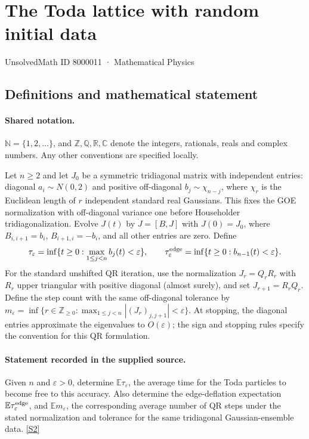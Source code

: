 \documentclass[11pt]{article}
\newcommand{\sref}[2]{\hyperlink{source:#1:#2}{[S#2]}}
\begin{document}
\setcounter{section}{8000010}
\section{The Toda lattice with random initial data}\label{8000011}
{\small\sffamily UnsolvedMath ID 8000011 · Mathematical Physics}
\subsection{Definitions and mathematical statement}

\paragraph{Shared notation.}$\mathbb N=\{1,2,\ldots\}$, and $\mathbb Z,\mathbb Q,\mathbb R,\mathbb C$ denote the integers, rationals, reals and complex numbers. Any other conventions are specified locally.


Let $n\ge2$ and let $J_0$ be a symmetric tridiagonal matrix with independent entries: diagonal $a_i\sim N(0,2)$ and positive off-diagonal $b_j\sim\chi_{n-j}$, where $\chi_r$ is the Euclidean length of $r$ independent standard real Gaussians. This fixes the GOE normalization with off-diagonal variance one before Householder tridiagonalization. Evolve $J(t)$ by $\dot J=[B,J]$ with $J(0)=J_0$, where $B_{i,i+1}=b_i$, $B_{i+1,i}=-b_i$, and all other entries are zero. Define \[\tau_\varepsilon=\inf\{t\ge0:\max_{1\le j<n}b_j(t)<\varepsilon\},\qquad \tau_\varepsilon^{\rm edge}=\inf\{t\ge0:b_{n-1}(t)<\varepsilon\}.\] For the standard unshifted QR iteration, use the normalization $J_r=Q_rR_r$ with $R_r$ upper triangular with positive diagonal (almost surely), and set $J_{r+1}=R_rQ_r$. Define the step count with the same off-diagonal tolerance by $m_\varepsilon=\inf\{r\in\mathbb Z_{\ge0}:\max_{1\le j<n}|(J_r)_{j,j+1}|<\varepsilon\}$. At stopping, the diagonal entries approximate the eigenvalues to $O(\varepsilon)$; the sign and stopping rules specify the convention for this QR formulation.
\paragraph{Statement recorded in the supplied source.}
Given $n$ and $\varepsilon>0$, determine $\mathbb E\tau_\varepsilon$, the average time for the Toda particles to become free to this accuracy. Also determine the edge-deflation expectation $\mathbb E\tau_\varepsilon^{\rm edge}$, and $\mathbb E m_\varepsilon$, the corresponding average number of QR steps under the stated normalization and tolerance for the same tridiagonal Gaussian-ensemble data. \sref{8000011}{2}
\end{document}
